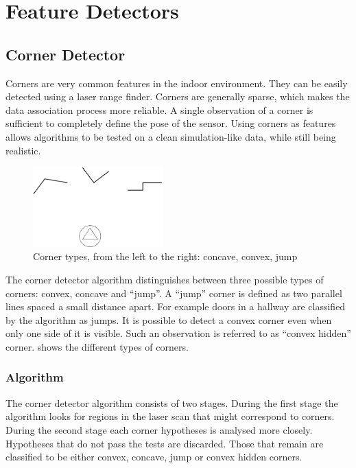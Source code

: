 

\section{Feature Detectors}

\subsection{Corner Detector}
\label{sec:corner_detector}
Corners are very common features in the indoor environment. They can be
easily detected using a laser range finder. Corners are generally
sparse, which makes the data association process more reliable. A single
observation of a corner is sufficient to completely define the pose of
the sensor. Using corners as features allows algorithms to be tested on
a clean simulation-like data, while still being realistic.


\begin{figure}[htbp]
  \centering
  \includegraphics[width=5cm]{Pics/fig_corner_types}
  \caption[Types of corner features]{Corner types, from the left to the right: concave, convex,
  jump}
  \label{fig:corner_types}
\end{figure}

The corner detector algorithm distinguishes between three possible types
of corners: convex, concave and ``jump''. A ``jump'' corner is defined
as two parallel lines spaced a small distance apart. For example doors
in a hallway are classified by the algorithm as jumps.  It is possible
to detect a convex corner even when only one side of it is visible. Such
an observation is referred to as ``convex hidden''
corner.  shows the different types of
corners.


\subsubsection{Algorithm}

The corner detector algorithm consists of two stages. During the first
stage the algorithm looks for regions in the laser scan that might
correspond to corners. During the second stage each corner hypotheses
is analysed more closely. Hypotheses that do not pass the tests are
discarded. Those that remain are classified to be either convex,
concave, jump or convex hidden corners.

